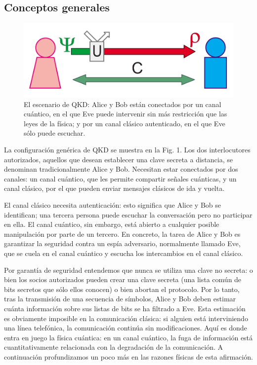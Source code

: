 \documentclass[a4paper,11pt]{book} %
\numberwithin{equation}{chapter}
\begin{document}
	
		\subsection{Conceptos generales}
		
	\begin{figure}[t]
	\centering 
	\includegraphics[width=0.5\linewidth]{Figuras/Fig_QKD_setup.png}
	\caption{El escenario de QKD: Alice y Bob están conectados por un canal cuántico, en el que Eve puede intervenir sin más restricción que las leyes de la física; y por un canal clásico autenticado, en el que Eve sólo puede escuchar.}
	\label{Fig_QKD_setup.png}
	\end{figure}
	
La configuración genérica de QKD se muestra en la Fig. 1. Los dos interlocutores autorizados, aquellos que desean establecer una clave secreta a distancia, se denominan tradicionalmente Alice y Bob. Necesitan estar conectados por dos canales: un canal cuántico, que les permite compartir señales cuánticas, y un canal clásico, por el que pueden enviar mensajes clásicos de ida y vuelta.

El canal clásico necesita autenticación: esto significa que Alice y Bob se identifican; una tercera persona puede escuchar la conversación pero no participar en ella. El canal cuántico, sin embargo, está abierto a cualquier posible manipulación por parte de un tercero. En concreto, la tarea de Alice y Bob es garantizar la seguridad contra un espía adversario, normalmente llamado Eve, que se cuela en el canal cuántico y escucha los intercambios en el canal clásico.

Por garantía de seguridad entendemos que nunca se utiliza una clave no secreta: o bien los socios autorizados pueden crear una clave secreta (una lista común de bits secretos que sólo ellos conocen) o bien abortan el protocolo. Por lo tanto, tras la transmisión de una secuencia de símbolos, Alice y Bob deben estimar cuánta información sobre sus listas de bits se ha filtrado a Eve. Esta estimación es obviamente imposible en la comunicación clásica: si alguien está interviniendo una línea telefónica, la comunicación continúa sin modificaciones. Aquí es donde entra en juego la física cuántica: en un canal cuántico, la fuga de información está cuantitativamente relacionada con la degradación de la comunicación. A continuación profundizamos un poco más en las razones físicas de esta afirmación.
\end{document}
